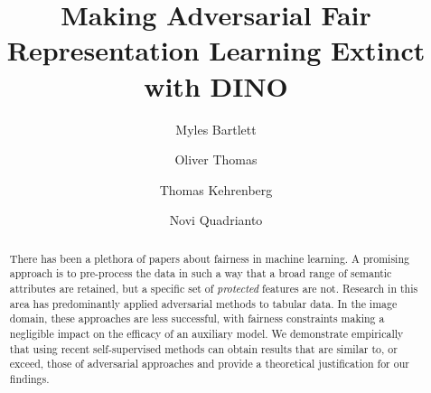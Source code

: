 \documentclass[sigconf,anonymous,review]{acmart}
\begin{document}
\title{Making Adversarial Fair Representation Learning Extinct with DINO}

\author{Myles Bartlett}
\author{Oliver Thomas}
\authornotemark[1]
\author{Thomas Kehrenberg}
\author{Novi Quadrianto}
\renewcommand{\shortauthors}{Bartlett and Thomas, et al.}

\begin{abstract}
There has been a plethora of papers about fairness in machine learning.
A promising approach is to pre-process the data in such a way that a broad range of semantic attributes are retained, but a specific set of \emph{protected} features are not.
Research in this area has predominantly applied adversarial methods to tabular data.
In the image domain, these approaches are less successful, with fairness constraints making a negligible impact on the efficacy of an auxiliary model.
We demonstrate empirically that using recent self-supervised methods can obtain results that are similar to, or exceed, those of adversarial approaches and provide a theoretical justification for our findings.
\end{abstract}
\end{document}
